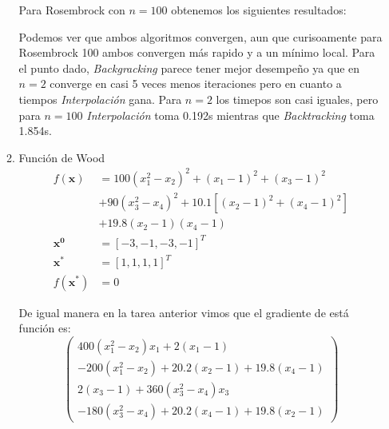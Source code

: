 \documentclass[10pt,twocolumn]{article}
\begin{document}
\begin{enumerate}
\begin{enumerate}
Para Rosembrock con $n = 100$ obtenemos los siguientes resultados:

\begin{table}[h]
\centering
\label{ros100}
\end{table}

Podemos ver que ambos algoritmos convergen, aun que curisoamente para Rosembrock 100 ambos convergen más rapido y a un mínimo local. Para el punto dado, \emph{Backgracking} parece tener mejor desempeño ya que en $n = 2$ converge en casi 5 veces menos iteraciones pero en cuanto a tiempos \emph{Interpolación} gana. Para $n = 2$ los timepos son casi iguales, pero para $n = 100$ \emph{Interpolación} toma  0.192s mientras que \emph{Backtracking} toma 1.854s.
\newpage

\item Función de Wood
\vspace{-1ex}
\begin{align*} 
f(\boldsymbol{x}) &= 100(x_1^2-x_2)^2 +(x_1-1)^2+(x_3-1)^2\\
&+90(x_3^2-x_4)^2+10.1[(x_2-1)^2+(x_4-1)^2]\\
&+19.8(x_2-1)(x_4-1) \\
\boldsymbol{x^0} &= [-3, -1, -3, -1]^T \\
\boldsymbol{x^*} &= [1, 1, 1, 1]^T \\
f(\boldsymbol{x^*}) &= 0
\end{align*}

De igual manera en la tarea anterior vimos que el gradiente de está función es:
$$
 \begin{pmatrix}
  400(x_1^2 - x_2)x_1 + 2(x_1 - 1) \\
  -200(x_1^2 - x_2) + 20.2(x_2 - 1) + 19.8(x_4 - 1)\\
  2(x_3 - 1) + 360(x_3^2 - x_4)x_3\\
  -180(x_3^2 - x_4) + 20.2(x_4 - 1) + 19.8(x_2 - 1)
 \end{pmatrix}
$$
\end{enumerate}


\end{enumerate}
\end{document}
